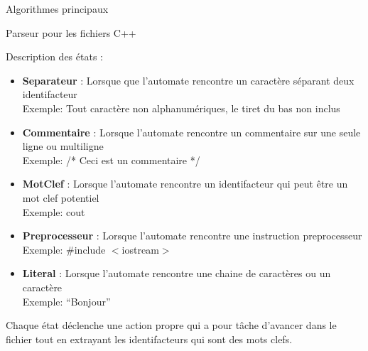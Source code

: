\documentclass{article}
\begin{document}
\begin{section}{Algorithmes principaux}
\begin{subsection}{Parseur pour les fichiers C++}
  \begin{paragraph}{Description des états :}
   \begin{itemize}
    \item \textbf{Separateur} : Lorsque que l'automate rencontre un caractère séparant deux identifacteur\\Exemple: Tout caractère non alphanumériques, le tiret du bas non inclus
    \item \textbf{Commentaire} : Lorsque l'automate rencontre un commentaire sur une seule ligne ou multiligne \\Exemple: /* Ceci est un commentaire */
    \item \textbf{MotClef} : Lorsque l'automate rencontre un identifacteur qui peut être un mot clef potentiel \\Exemple: cout
    \item \textbf{Preprocesseur} : Lorsque l'automate rencontre une instruction preprocesseur \\Exemple: \#include $<$iostream$>$
    \item \textbf{Literal} : Lorsque l'automate rencontre une chaine de caractères ou un caractère\\Exemple: ``Bonjour''\\
   \end{itemize}
  \end{paragraph}
  
  Chaque état déclenche une action propre qui a pour tâche d'avancer dans le fichier tout en extrayant les identifacteurs qui sont des mots clefs.
  \end{subsection}

\end{section}
\end{document}
